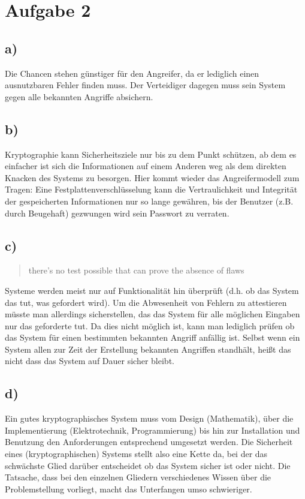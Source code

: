 \documentclass[10pt,a4paper]{article}
\begin{document}
\section*{Aufgabe 2}
\subsection*{a)} Die Chancen stehen günstiger für den Angreifer, da er lediglich einen ausnutzbaren Fehler finden muss. Der Verteidiger dagegen muss sein System gegen alle bekannten Angriffe absichern.
\subsection*{b)} Kryptographie kann Sicherheitsziele nur  bis zu dem Punkt schützen, ab dem es einfacher ist sich die Informationen auf einem Anderen weg als dem direkten Knacken des Systems zu besorgen. Hier kommt wieder das Angreifermodell zum Tragen: Eine Festplattenverschlüsselung kann die Vertraulichkeit und Integrität der gespeicherten Informationen nur so lange gewähren, bis der Benutzer (z.B. durch Beugehaft) gezwungen wird sein Passwort zu verraten.
\subsection*{c)} 
\begin{quote}
there’s no test possible that can prove the absence of flaws
\end{quote}
Systeme werden meist nur auf Funktionalität hin überprüft (d.h. ob das System das tut, was gefordert wird). Um die Abwesenheit von Fehlern zu attestieren müsste man allerdings sicherstellen, das das System für alle möglichen Eingaben nur das geforderte tut. Da dies nicht möglich ist, kann man lediglich prüfen ob das System für einen bestimmten bekannten Angriff anfällig ist. Selbst wenn ein System allen zur Zeit der Erstellung bekannten Angriffen standhält, heißt das nicht
dass das System auf Dauer sicher bleibt.
\subsection*{d)}
Ein gutes kryptographisches System muss vom Design (Mathematik), über die Implementierung (Elektrotechnik, Programmierung) bis hin zur Installation und Benutzung den Anforderungen entsprechend umgesetzt werden. Die Sicherheit eines (kryptographischen) Systems stellt also eine Kette da, bei der das schwächste Glied darüber entscheidet ob das System sicher ist oder nicht. Die Tatsache, dass bei den einzelnen Gliedern verschiedenes Wissen über die Problemstellung vorliegt, macht das Unterfangen umso schwieriger. 
\end{document}
